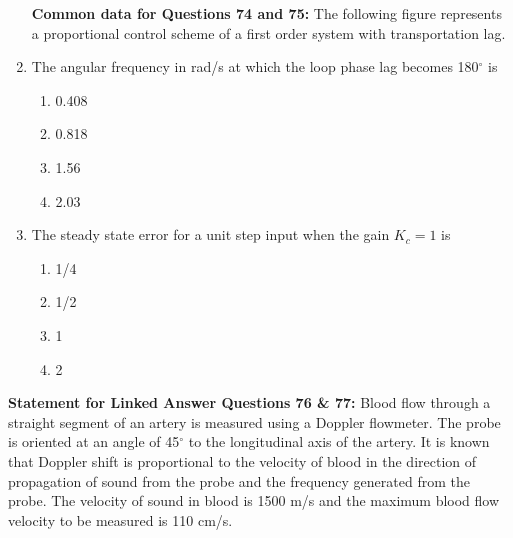 \documentclass[journal]{IEEEtran}
\begin{document}
\begin{enumerate}
\begin{enumerate}
\end{enumerate}


\textbf{Common data for Questions 74 and 75:}  
The following figure represents a proportional control scheme of a first order system with transportation lag.  

\item 
The angular frequency in rad/s at which the loop phase lag becomes 180$^\circ$ is  

\begin{multicols}{2}
\begin{enumerate}
\item 0.408  
\item 0.818  
\item 1.56  
\item 2.03  
\end{enumerate}
\end{multicols}



\item 
The steady state error for a unit step input when the gain $K_c = 1$ is  

\begin{multicols}{2}
\begin{enumerate}
\item 1/4  
\item 1/2  
\item 1  
\item 2  
\end{enumerate}
\end{multicols}


\end{enumerate}

\textbf{Statement for Linked Answer Questions 76 \& 77:}  
Blood flow through a straight segment of an artery is measured using a Doppler flowmeter. The probe is oriented at an angle of 45$^\circ$ to the longitudinal axis of the artery. It is known that Doppler shift is proportional to the velocity of blood in the direction of propagation of sound from the probe and the frequency generated from the probe. The velocity of sound in blood is 1500 m/s and the maximum blood flow velocity to be measured is 110 cm/s.  
\end{document}
